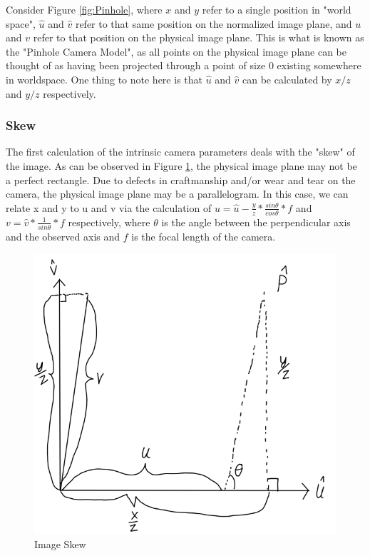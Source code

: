 Consider Figure \ref{fig:Pinhole}, where $x$ and $y$ refer to a single position in "world space", $\hat{u}$ and $\hat{v}$ refer to that same position on the normalized image plane, and $u$ and $v$ refer to that position on the physical image plane.  This is what is known as the "Pinhole Camera Model", as all points on the physical image plane can be thought of as having been projected through a point of size 0 existing somewhere in worldspace.  One thing to note here is that $\hat{u}$ and $\hat{v}$ can be calculated by $x/z$ and $y/z$ respectively.
\subsubsection{Skew}
The first calculation of the intrinsic camera parameters deals with the "skew" of the image.  As can be observed in Figure \ref{fig:Skew}, the physical image plane may not be a perfect rectangle.  Due to defects in craftmanship and/or wear and tear on the camera, the physical image plane may be a parallelogram.  In this case, we can relate x and y to u and v via the calculation of $u=\hat{u}-\frac{y}{z} * \frac{sin  \theta }{ cos \theta} * f$ and $v=\hat{v}*\frac{1}{sin \theta} * f$ respectively, where $\theta$ is the angle between the perpendicular axis and the observed axis and $f$ is the focal length of the camera.
\begin{figure}[h!]
	\includegraphics[scale=.5]{Image2}
	\caption{Image Skew}
	\label{fig:Skew}
\end{figure}
